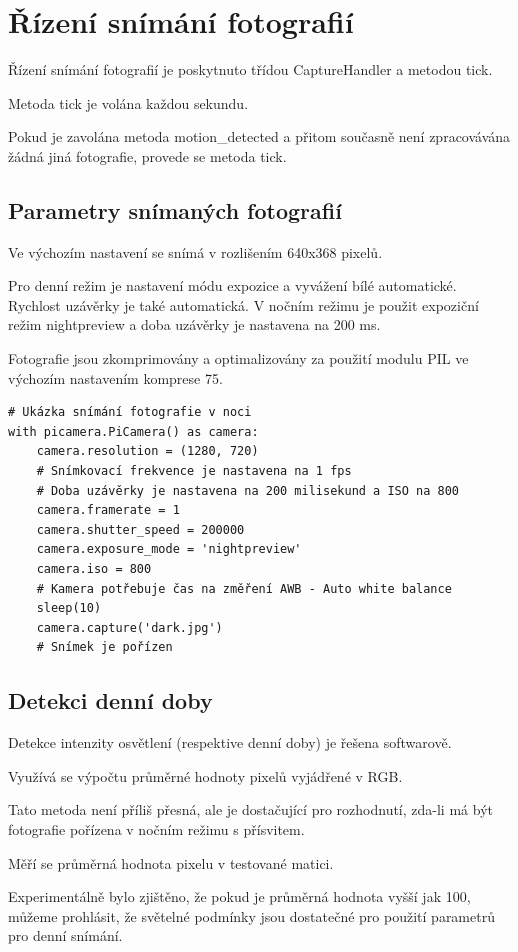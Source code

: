 \section{Řízení snímání fotografií}
Řízení snímání fotografií je poskytnuto třídou CaptureHandler a metodou tick.

Metoda tick je volána každou sekundu.

Pokud je zavolána metoda motion\_detected a přitom současně není zpracovávána žádná jiná fotografie, provede se metoda tick.

\subsection*{Parametry snímaných fotografií}
Ve výchozím nastavení se snímá v rozlišením 640x368 pixelů.

Pro denní režim je nastavení módu expozice a vyvážení bílé automatické. Rychlost uzávěrky je také automatická. V nočním režimu je použit expoziční režim nightpreview a doba uzávěrky je nastavena na 200 ms.

Fotografie jsou zkomprimovány a optimalizovány za použití modulu PIL ve výchozím nastavením komprese 75.
\clearpage
\begin{verbatim}
# Ukázka snímání fotografie v noci 
with picamera.PiCamera() as camera:
    camera.resolution = (1280, 720)
    # Snímkovací frekvence je nastavena na 1 fps 
    # Doba uzávěrky je nastavena na 200 milisekund a ISO na 800
    camera.framerate = 1
    camera.shutter_speed = 200000
    camera.exposure_mode = 'nightpreview'
    camera.iso = 800
    # Kamera potřebuje čas na změření AWB - Auto white balance
    sleep(10)
    camera.capture('dark.jpg')
    # Snímek je pořízen
\end{verbatim}

\subsection*{Detekci denní doby}
Detekce intenzity osvětlení (respektive denní doby) je řešena softwarově.

Využívá se výpočtu průměrné hodnoty pixelů vyjádřené v RGB.

Tato metoda není příliš přesná, ale je dostačující pro rozhodnutí, zda-li má být fotografie pořízena v nočním režimu s přísvitem.

Měří se průměrná hodnota pixelu v testované matici.

Experimentálně bylo zjištěno, že pokud je průměrná hodnota vyšší jak 100, můžeme prohlásit, že světelné podmínky jsou dostatečné pro použití parametrů pro denní snímání.


